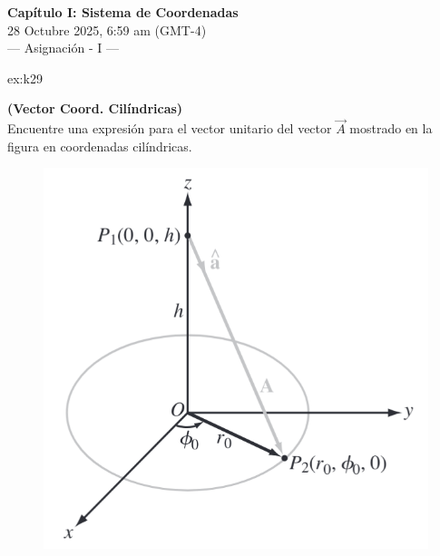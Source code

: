 \begin{center}
        \LARGE{\textbf{Capítulo I: Sistema de Coordenadas}}\\	
        \vspace{0.2cm}
        \large{28 Octubre 2025, 6:59 am (GMT-4)}\\
        \large{— Asignación - I —}
\end{center}

\begin{excercise}[][][$\vec{e}_A=\displaystyle{\frac{r_0\vec{e}_r-h\vec{k}}{\sqrt{r_0^2+h^2}}}$]{ex:k29}{
    \textbf{(Vector Coord. Cilíndricas)}\\
    Encuentre una expresión para el vector unitario del vector $\vec{A}$ mostrado en la figura en coordenadas cilíndricas.
    \begin{figure}[H]
        \centering
        \includegraphics[width=0.7\linewidth]{img/01_electric-field/1.png}
    \end{figure}
}
\end{excercise}

